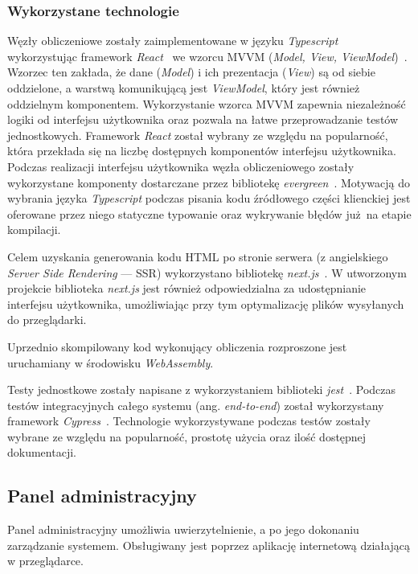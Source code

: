 \documentclass[a4paper,11pt,twoside]{report}
\theoremstyle{definition}
\begin{document}
\subsubsection{Wykorzystane technologie}
Węzły obliczeniowe zostały zaimplementowane w języku \textit{Typescript}~\cite{typescript} wykorzystując framework \textit{React}~\cite{react} we wzorcu MVVM (\textit{Model, View, ViewModel})~\cite{mvvm}.
Wzorzec ten zakłada, że dane (\textit{Model}) i ich prezentacja (\textit{View}) są od siebie oddzielone, a warstwą komunikującą jest \textit{ViewModel}, który jest również oddzielnym komponentem.
Wykorzystanie wzorca MVVM zapewnia niezależność logiki od interfejsu użytkownika oraz pozwala na łatwe przeprowadzanie testów jednostkowych.
Framework \textit{React} został wybrany ze względu na popularność, która przekłada się na liczbę dostępnych komponentów interfejsu użytkownika.
Podczas realizacji interfejsu użytkownika węzła obliczeniowego zostały wykorzystane komponenty dostarczane przez bibliotekę \textit{evergreen}~\cite{evergreen}.
Motywacją do wybrania języka \textit{Typescript} podczas pisania kodu źródłowego części klienckiej jest oferowane przez niego statyczne typowanie oraz wykrywanie błędów już na etapie kompilacji.

Celem uzyskania generowania kodu HTML po stronie serwera (z angielskiego \textit{Server Side Rendering} --- SSR) wykorzystano bibliotekę \textit{next.js}~\cite{next.js}. W utworzonym projekcie biblioteka \textit{next.js} jest również odpowiedzialna za udostępnianie interfejsu użytkownika, umożliwiając przy tym optymalizację plików wysyłanych do przeglądarki.

Uprzednio skompilowany kod wykonujący obliczenia rozproszone jest uruchamiany w środowisku \textit{WebAssembly}.

Testy jednostkowe zostały napisane z wykorzystaniem biblioteki \textit{jest}~\cite{jest}. Podczas testów integracyjnych całego systemu (ang. \textit{end-to-end}) został wykorzystany framework \textit{Cypress}~\cite{cypress}. Technologie wykorzystywane podczas testów zostały wybrane ze względu na popularność, prostotę użycia oraz ilość dostępnej dokumentacji.

\subsection{Panel administracyjny}

Panel administracyjny umożliwia uwierzytelnienie, a po jego dokonaniu zarządzanie systemem. Obsługiwany jest poprzez aplikację internetową działającą w przeglądarce.
\end{document}

